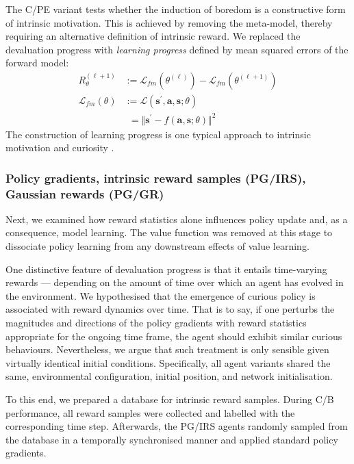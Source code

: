 \documentclass[utf8]{frontiersSCNS}
\newcommand{\bs}{\boldsymbol}
\begin{document}
The C/PE variant tests whether the induction of boredom is a constructive form of intrinsic motivation. This is achieved by removing the meta-model, thereby requiring an alternative definition of intrinsic reward. We replaced the devaluation progress with {\it learning progress} defined by mean squared errors of the forward model:
%
	\begin{equation}
	\begin{aligned}
	R_\theta^{(\ell + 1)} 
	&:= 
	\mathcal{L}_{fm}(\theta^{(\ell)}) - \mathcal{L}_{fm}(\theta^{(\ell+1)}) \\
	\mathcal{L}_{fm}(\theta)
	&:= 
	\mathcal{L}(\bs{s}^\prime, \bs{a}, \bs{s}; \theta) \\
	&\phantom{:}=
	\Vert \bs{s}^\prime - f(\bs{a}, \bs{s}; \theta) \Vert^2
	\end{aligned}
	\end{equation}
%
The construction of learning progress is one typical approach to intrinsic motivation and curiosity \citep{pathak2017icm, schmidhuber1991}.

\subsubsection{Policy gradients, intrinsic reward samples (PG/IRS), Gaussian rewards (PG/GR)}

Next, we examined how reward statistics alone influences policy update and, as a consequence, model learning. The value function was removed at this stage to dissociate policy learning from any downstream effects of value learning. 

One distinctive feature of devaluation progress is that it entails time-varying rewards --- depending on the amount of time over which an agent has evolved in the environment. We hypothesised that the emergence of curious policy is associated with reward dynamics over time. That is to say, if one perturbs the magnitudes and directions of the policy gradients with reward statistics appropriate for the ongoing time frame, the agent should exhibit similar curious behaviours. Nevertheless, we argue that such treatment is only sensible given virtually identical initial conditions. Specifically, all agent variants shared the same, environmental configuration, initial position, and network initialisation.

To this end, we prepared a database for intrinsic reward samples. During C/B performance, all reward samples were collected and labelled with the corresponding time step. Afterwards, the PG/IRS agents randomly sampled from the database in a temporally synchronised manner and applied standard policy gradients.
\end{document}
